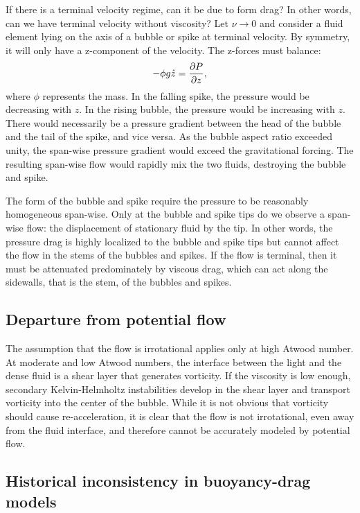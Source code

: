 If there is a terminal velocity regime, can it be due to form drag?
In other words, can we have terminal velocity without viscosity?
Let $\nu \rightarrow 0$ and consider a fluid element lying on the axis
of a bubble or spike at terminal velocity.
By symmetry, it will only have a z-component of the velocity.
The z-forces must balance:
\begin{equation}
- \phi g \hat{z} = \frac{\partial P}{\partial z} ,
\end{equation}
where $\phi$ represents the mass.
In the falling spike, the pressure would be decreasing with $z$.
In the rising bubble, the pressure would be increasing with $z$.
There would necessarily be a pressure gradient between the head of the bubble and the tail of the spike, and vice versa.
As the bubble aspect ratio exceeded unity, the span-wise pressure gradient would exceed the gravitational forcing.
The resulting span-wise flow would rapidly mix the two fluids, destroying the bubble and spike.

The form of the bubble and spike require the pressure to be reasonably homogeneous span-wise.
Only at the bubble and spike tips do we observe a span-wise flow: the displacement of stationary fluid by the tip.
In other words, the pressure drag is highly localized to the bubble and spike tips but cannot affect the flow in the stems of the bubbles and spikes.
If the flow is terminal, then it must be attenuated predominately by viscous drag, which can act along the sidewalls, that is the stem, of the bubbles and spikes.

\subsection{Departure from potential flow}
The assumption that the flow is irrotational applies only at high Atwood number.
At moderate and low Atwood numbers, the interface between the light and the dense fluid is a shear layer that generates vorticity.
If the viscosity is low enough, secondary Kelvin-Helmholtz instabilities develop in the shear layer and transport vorticity into the center of the bubble.
While it is not obvious that vorticity should cause re-acceleration, it is clear that the flow is not irrotational, even away from the fluid interface, and therefore cannot be accurately modeled by potential flow.

\subsection{Historical inconsistency in buoyancy-drag models}

